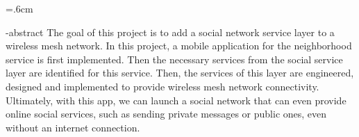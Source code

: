 
\baselineskip=.6cm
\begin{latin}
\en-abstract{
The goal of this project is to add a social network service layer to a wireless mesh network. In this project, a mobile application for the neighborhood service is first implemented. Then the necessary services from the social service layer are identified for this service. Then, the services of this layer are engineered, designed and implemented to provide wireless mesh network connectivity. Ultimately, with this app, we can launch a social network that can even provide online social services, such as sending private messages or public ones, even without an internet connection.
}
\latinfirstPage
\end{latin}
